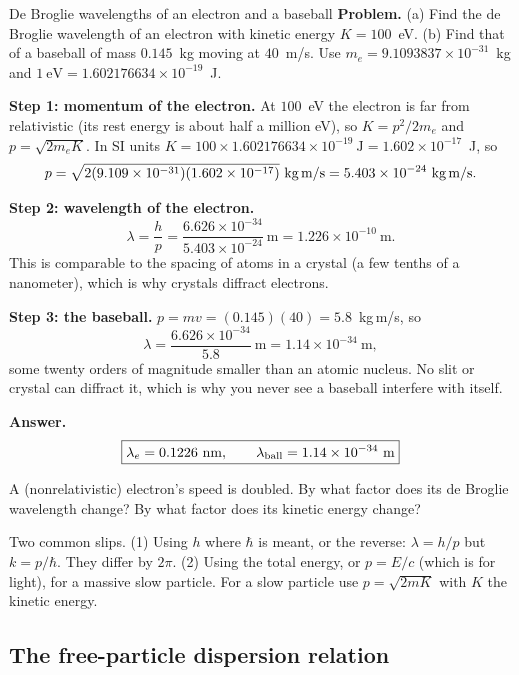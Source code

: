 \begin{sample}{De Broglie wavelengths of an electron and a baseball}
\textbf{Problem.} (a) Find the de Broglie wavelength of an electron with kinetic energy $K=100$~eV. (b) Find that of a baseball of mass $0.145$~kg moving at $40$~m/s. Use $m_e=9.1093837\times10^{-31}$~kg and $1~\text{eV}=1.602176634\times10^{-19}$~J.

\textbf{Step 1: momentum of the electron.} At $100$~eV the electron is far from relativistic (its rest energy is about half a million eV), so $K=p^2/2m_e$ and $p=\sqrt{2m_eK}$. In SI units $K=100\times1.602176634\times10^{-19}~\text{J}=1.602\times10^{-17}$~J, so
\[
p=\sqrt{2(9.109\times10^{-31})(1.602\times10^{-17})}~\text{kg\,m/s}=5.403\times10^{-24}~\text{kg\,m/s}.
\]

\textbf{Step 2: wavelength of the electron.}
\[
\lambda=\frac{h}{p}=\frac{6.626\times10^{-34}}{5.403\times10^{-24}}~\text{m}=1.226\times10^{-10}~\text{m}.
\]
This is comparable to the spacing of atoms in a crystal (a few tenths of a nanometer), which is why crystals diffract electrons.

\textbf{Step 3: the baseball.} $p=mv=(0.145)(40)=5.8$~kg\,m/s, so
\[
\lambda=\frac{6.626\times10^{-34}}{5.8}~\text{m}=1.14\times10^{-34}~\text{m},
\]
some twenty orders of magnitude smaller than an atomic nucleus. No slit or crystal can diffract it, which is why you never see a baseball interfere with itself.

\textbf{Answer.}
\[
\boxed{\lambda_e=0.1226~\text{nm},\qquad \lambda_{\rm ball}=1.14\times10^{-34}~\text{m}}
\]
\end{sample}

\begin{checkpoint}
A (nonrelativistic) electron's speed is doubled. By what factor does its de Broglie wavelength change? By what factor does its kinetic energy change?
\end{checkpoint}

\begin{pitfall}
Two common slips. (1) Using $h$ where $\hbar$ is meant, or the reverse: $\lambda=h/p$ but $k=p/\hbar$. They differ by $2\pi$. (2) Using the total energy, or $p=E/c$ (which is for light), for a massive slow particle. For a slow particle use $p=\sqrt{2mK}$ with $K$ the kinetic energy.
\end{pitfall}

\subsection{The free-particle dispersion relation}

